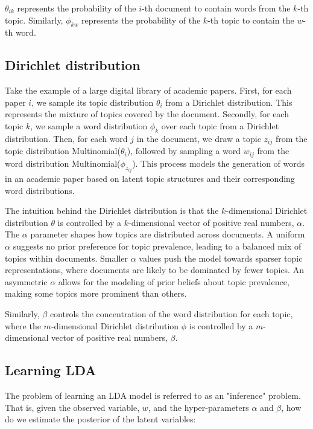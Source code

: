 $\theta_{ik}$ represents the probability of the $i$-th document to contain words from the $k$-th topic. Similarly, $\phi_{kw}$ represents the probability of the $k$-th topic to contain the $w$-th word.

\subsection{Dirichlet distribution}

Take the example of a large digital library of academic papers. First, for each paper $i$, we sample its topic distribution $\theta_i$ from a Dirichlet distribution. This represents the mixture of topics covered by the document. Secondly, for each topic $k$, we sample a word distribution $\phi_k$ over each topic from a Dirichlet distribution. Then, for each word $j$ in the document, we draw a topic $z_{ij}$ from the topic distribution Multinomial($\theta_i$), followed by sampling a word $w_{ij}$ from the word distribution Multinomial($\phi_{z_{ij}}$). This process models the generation of words in an academic paper based on latent topic structures and their corresponding word distributions.

The intuition behind the Dirichlet distribution is that the $k$-dimensional Dirichlet distribution $\theta$ is controlled by a $k$-dimensional vector of positive real numbers, $\alpha$. The $\alpha$ parameter shapes how topics are distributed across documents. A uniform $\alpha$ suggests no prior preference for topic prevalence, leading to a balanced mix of topics within documents. Smaller $\alpha$ values push the model towards sparser topic representations, where documents are likely to be dominated by fewer topics. An asymmetric $\alpha$ allows for the modeling of prior beliefs about topic prevalence, making some topics more prominent than others.

Similarly, $\beta$ controls the concentration of the word distribution for each topic, where the $m$-dimensional Dirichlet distribution $\phi$ is controlled by a $m$-dimensional vector of positive real numbers, $\beta$.

\subsection{Learning LDA}

The problem of learning an LDA model is referred to as an "inference" problem. That is, given the observed variable, \( w \), and the hyper-parameters \( \alpha \) and \( \beta \), how do we estimate the posterior of the latent variables:

